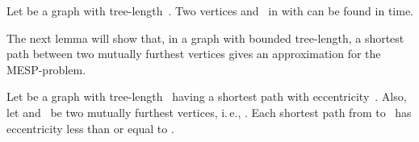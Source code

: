 \documentclass[10pt]{llncs}
\makeatletter
\newcommand{\ie}{i.\,e.\@ifnextchar{,}{}{~}}
\makeatother
\begin{document}
\begin{corollary}
    \label{cor:mutualDistTreeLen}
Let  be a graph with tree-length~.
Two vertices  and~ in  with  can be found in  time.
\end{corollary}

The next lemma will show that, in a graph with bounded tree-length, a shortest path between two mutually furthest vertices gives an approximation for the MESP-problem.

\begin{lemma}
    \label{lem:ApproxTreeLen}
Let  be a graph with tree-length~ having a shortest path with eccentricity~.
Also, let  and~ be two mutually furthest vertices, \ie, .
Each shortest path from  to~ has eccentricity less than or equal to .
\end{lemma}
\end{document}
